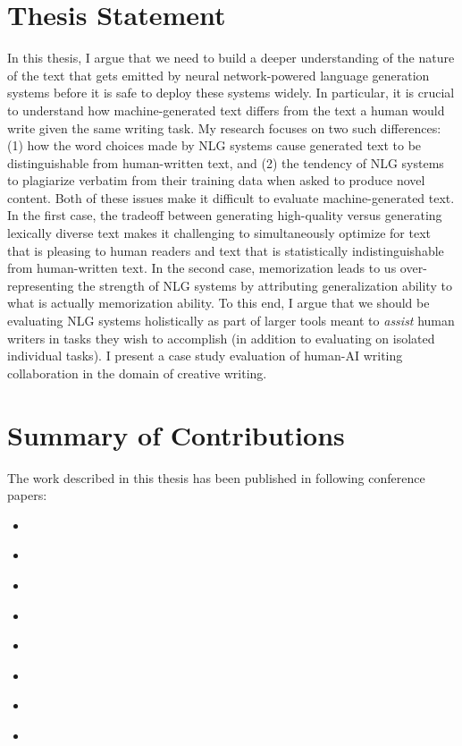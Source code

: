 \section{Thesis Statement}
In this thesis, I argue that we need to build a deeper understanding of the nature of the text that gets emitted by neural network-powered language generation systems before it is safe to deploy these systems widely.
In particular, it is crucial to understand how machine-generated text differs from the text a human would write given the same writing task.
My research focuses on two such differences: (1) how the word choices made by NLG systems cause generated text to be distinguishable from human-written text, and (2) the tendency of NLG systems to plagiarize verbatim from their training data when asked to produce novel content.
Both of these issues make it difficult to evaluate machine-generated text.
In the first case, the tradeoff between generating high-quality versus generating lexically diverse text makes it challenging to simultaneously optimize for text that is pleasing to human readers and text that is statistically indistinguishable from human-written text.
In the second case, memorization leads to us over-representing the strength of NLG systems by attributing generalization ability to what is actually memorization ability.
To this end, I argue that we should be evaluating NLG systems holistically as part of larger tools meant to \textit{assist} human writers in tasks they wish to accomplish (in addition to evaluating on isolated individual tasks).
I present a case study evaluation of human-AI writing collaboration in the domain of creative writing.

\section{Summary of Contributions}
The work described in this thesis has been published in following conference papers:

\begin{itemize}
  \item \cite{ippolito2019comparison} 
  \item \cite{ippolito2020automatic} 
  \item \cite{lee2021deduplicating} 
  \item \cite{reif2021recipe} 
  \item \cite{wordcraft} 
  \item \cite{yuan2022wordcraft} 
  \item \cite{carlini2022quantifying} 
  \item \cite{dugan2020roft} 
\end{itemize}

